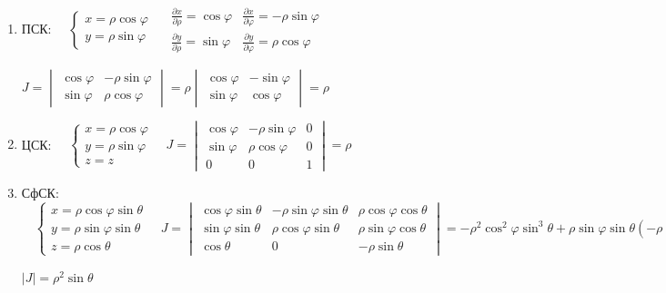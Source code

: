 \documentclass[12pt]{article}
\begin{document}
    \begin{enumerate}
        \item ПСК: $\quad \begin{cases}
                              x = \rho\cos\varphi \\ y = \rho\sin\varphi
        \end{cases} \quad
        \begin{matrix}
            \frac{\partial x}{\partial \rho} = \cos\varphi & \frac{\partial x}{\partial \varphi} = -\rho\sin\varphi \\
            \frac{\partial y}{\partial \rho} = \sin\varphi & \frac{\partial y}{\partial \varphi} = \rho\cos\varphi
        \end{matrix}$

        $J = \begin{vmatrix}\cos\varphi & -\rho\sin\varphi \\ \sin\varphi & \rho\cos\varphi\end{vmatrix} =
        \rho \begin{vmatrix}\cos\varphi & -\sin\varphi \\ \sin\varphi & \cos\varphi\end{vmatrix} = \rho$

        \item ЦСК: $\quad \begin{cases}
            x = \rho\cos\varphi \\ y = \rho\sin\varphi \\ z = z
        \end{cases} \quad J = \begin{vmatrix}\cos\varphi & -\rho\sin\varphi & 0 \\ \sin\varphi & \rho\cos\varphi & 0 \\ 0 & 0 & 1\end{vmatrix} = \rho$

        \item СфСК: $\quad \begin{cases}
            x = \rho\cos\varphi\sin\theta \\ y = \rho\sin\varphi\sin\theta \\ z = \rho \cos\theta
        \end{cases} \quad J = \begin{vmatrix}\cos\varphi\sin\theta & -\rho\sin\varphi\sin\theta & \rho\cos\varphi\cos\theta \\ \sin\varphi\sin\theta & \rho\cos\varphi\sin\theta & \rho\sin\varphi\cos\theta \\ \cos\theta & 0 & -\rho\sin\theta\end{vmatrix} = -\rho^2 \cos^2 \varphi \sin^3 \theta + \rho \sin \varphi \sin \theta (-\rho \sin \varphi \sin^2 \theta - \rho \sin \varphi \cos^2 \theta) - \rho^2 \cos^2 \varphi \cos^2 \theta \sin \theta = -\rho^2 (\cos^2 \varphi \sin \theta + \sin^2 \varphi \sin\theta) = -\rho^2 \sin \theta$

        $|J| = \rho^2 \sin \theta$
    \end{enumerate}
\end{document}

